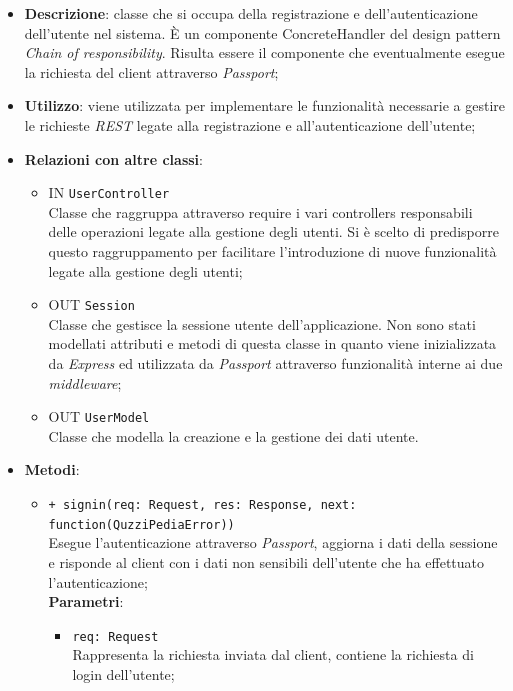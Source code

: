 \begin{itemize}
	\item 
	\textbf{Descrizione}:
	classe che si occupa della registrazione e dell'autenticazione dell'utente nel sistema. È un componente ConcreteHandler del design pattern \textit{Chain of responsibility}. Risulta essere il componente che eventualmente esegue la richiesta del client attraverso \textit{Passport};
	\item
	\textbf{Utilizzo}:
	viene utilizzata per implementare le funzionalità necessarie a gestire le richieste \textit{REST} legate alla registrazione e all'autenticazione dell'utente;
	\item
	\textbf{Relazioni con altre classi}:
	\begin{itemize}
		\item
		IN \texttt{UserController} \\
		Classe che raggruppa attraverso require i vari controllers responsabili delle operazioni legate alla gestione degli utenti. Si è scelto di predisporre questo raggruppamento per facilitare l'introduzione di nuove funzionalità legate alla gestione degli utenti;
		\item
		OUT \texttt{Session} \\
		Classe che gestisce la sessione utente dell'applicazione. Non sono stati modellati attributi e metodi di questa classe in quanto viene inizializzata da \textit{Express} ed utilizzata da \textit{Passport} attraverso funzionalità interne ai due \textit{middleware};
		\item
		OUT \texttt{UserModel} \\
		Classe che modella la creazione e la gestione dei dati utente.
	\end{itemize}
	\item
	\textbf{Metodi}:
	\begin{itemize}
		\item
		\texttt{+ signin(req: Request, res: Response, next: function(QuzziPediaError))} \\
		Esegue l'autenticazione attraverso \textit{Passport}, aggiorna i dati della sessione e risponde al client con i dati non sensibili dell'utente che ha effettuato l'autenticazione; \\
		\textbf{Parametri}:
		 \begin{itemize}
		  \item
			\texttt{req: Request} \\
			Rappresenta la richiesta inviata dal client, contiene la richiesta di login dell’utente;

\end{itemize}
\end{itemize}
\end{itemize}
